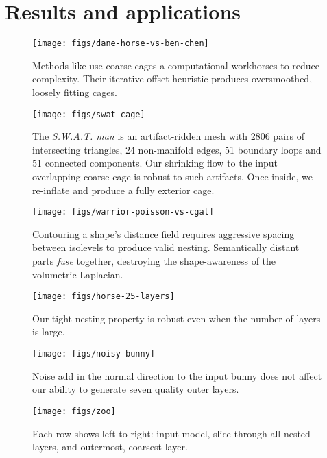 
\section{Results and applications}
\label{sec:results}



\begin{figure}
  \texttt{[image: figs/dane-horse-vs-ben-chen]}
  \caption{Methods like \protect\cite{Ben-Chen:2009:SDT} use coarse cages a
  computational workhorses to reduce complexity. Their iterative offset
  heuristic produces oversmoothed, loosely fitting cages.}
  \label{fig:dane-vs-ben-chen}
\end{figure}

\begin{figure}
  \texttt{[image: figs/swat-cage]}
  \caption{The \emph{S.W.A.T. man} is an artifact-ridden mesh with 2806 pairs
  of intersecting triangles, 24 non-manifold edges, 51 boundary loops and 51
  connected components. Our shrinking flow to the input overlapping coarse cage
  is robust to such artifacts. Once inside, we re-inflate and produce a fully
  exterior cage.}
  \label{fig:swat-cage}
\end{figure}

\begin{figure}
  \texttt{[image: figs/warrior-poisson-vs-cgal]}
  \caption{Contouring a shape's distance field requires aggressive spacing
  between isolevels to produce valid nesting. Semantically distant parts
  \emph{fuse} together, destroying the shape-awareness of the volumetric
  Laplacian.} 
  \label{fig:warrior-poisson}
\end{figure}

\begin{figure}
  \texttt{[image: figs/horse-25-layers]}
  \caption{Our tight nesting property is robust even when the number of layers
  is large.}
  \label{fig:horse-25-layers}
\end{figure}

\begin{figure}
  \texttt{[image: figs/noisy-bunny]}
  \caption{Noise add in the normal direction to the input bunny does not
  affect our ability to generate seven quality outer layers.}
  \label{fig:noisy-bunny}
\end{figure}

\begin{figure}
  \texttt{[image: figs/zoo]}
  \caption{Each row shows left to right: input model, slice through all nested
  layers, and outermost, coarsest layer.}
  \label{fig:zoo}
\end{figure}

